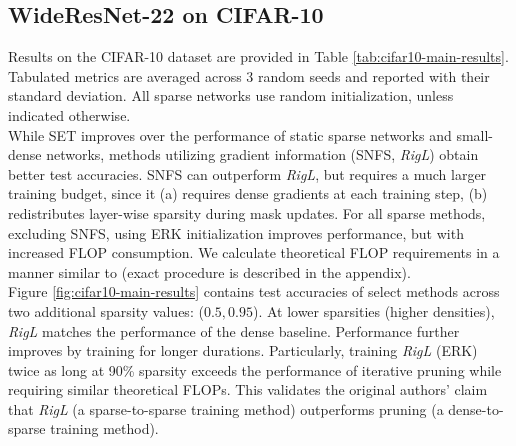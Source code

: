 \subsection{WideResNet-22 on CIFAR-10}\label{cifar-10-results}


   
Results on the CIFAR-10 dataset are provided in Table \ref{tab:cifar10-main-results}. Tabulated metrics are averaged across 3 random seeds and reported with their standard deviation. All sparse networks use random initialization, unless indicated otherwise.\\

While SET improves over the performance of static sparse networks and small-dense networks, methods utilizing gradient information (SNFS, \textit{RigL}) obtain better test accuracies. SNFS can outperform \textit{RigL}, but requires a much larger training budget, since it (a) requires dense gradients at each training step, (b) redistributes layer-wise sparsity during mask updates. For all sparse methods, excluding SNFS, using ERK initialization improves performance, but with increased FLOP consumption. We calculate theoretical FLOP requirements in a manner similar to \citet{rigl} (exact procedure is described in the appendix). \\

Figure \ref{fig:cifar10-main-results} contains test accuracies of select methods across two additional sparsity values: ($0.5, 0.95$). At lower sparsities (higher densities), \textit{RigL} matches the performance of the dense baseline. Performance further improves by training for longer durations. Particularly, training \textit{RigL} (ERK) twice as long at 90\% sparsity exceeds the performance of iterative pruning while requiring similar theoretical FLOPs. This validates the original authors' claim that \textit{RigL} (a sparse-to-sparse training method) outperforms pruning (a dense-to-sparse training method). 

